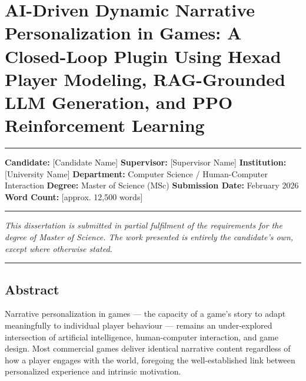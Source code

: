 \section{AI-Driven Dynamic Narrative Personalization in Games: A
Closed-Loop Plugin Using Hexad Player Modeling, RAG-Grounded LLM
Generation, and PPO Reinforcement
Learning}\label{ai-driven-dynamic-narrative-personalization-in-games-a-closed-loop-plugin-using-hexad-player-modeling-rag-grounded-llm-generation-and-ppo-reinforcement-learning}

\begin{center}\rule{0.5\linewidth}{0.5pt}\end{center}

\textbf{Candidate:} {[}Candidate Name{]} \textbf{Supervisor:}
{[}Supervisor Name{]} \textbf{Institution:} {[}University Name{]}
\textbf{Department:} Computer Science / Human-Computer Interaction
\textbf{Degree:} Master of Science (MSc) \textbf{Submission Date:}
February 2026 \textbf{Word Count:} {[}approx. 12,500 words{]}

\begin{center}\rule{0.5\linewidth}{0.5pt}\end{center}

\emph{This dissertation is submitted in partial fulfilment of the
requirements for the degree of Master of Science. The work presented is
entirely the candidate's own, except where otherwise stated.}

\begin{center}\rule{0.5\linewidth}{0.5pt}\end{center}

\subsection{Abstract}\label{abstract}

Narrative personalization in games --- the capacity of a game's story to
adapt meaningfully to individual player behaviour --- remains an
under-explored intersection of artificial intelligence, human-computer
interaction, and game design. Most commercial games deliver identical
narrative content regardless of how a player engages with the world,
foregoing the well-established link between personalized experience and
intrinsic motivation.


